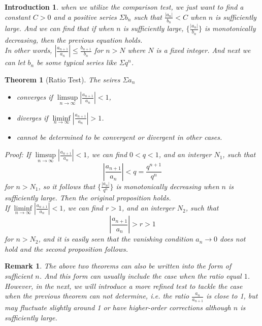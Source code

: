 \documentclass[12pt]{article}
\theoremstyle{oneline}
\newtheorem{theorem}{Theorem}[subsection]
\newtheorem{remark}{Remark}[subsection]
\theoremstyle{twoline}
\newtheorem{introduction}{Introduction}
\begin{document}
\begin{introduction}
\hspace*{2em} when we utilize the comparison test, we just want to find a constant $C>0$ and a positive series $\Sigma b_n$ such that $\frac{|a_n|}{b_n}<C$ when $n$ is sufficiently large. And we can find that if when $n$ is sufficiently large, $\{\frac{|a_n|}{b_n}\}$ is monotonically decreasing, then the previous equation holds.\\
\hspace*{2em} In other words, $|\frac{a_{n+1}}{a_n}|\leq \frac{b_{n+1}}{b_n}$ for $n>N$ where $N$ is a fixed integer. And next we can let $b_n$ be some typical series like $\Sigma q^n$.
\end{introduction}

\begin{theorem}[Ratio Test]
The seires $\Sigma a_n$
\begin{itemize}
  \item converges if $\limsup\limits_{n\to\infty}|\frac{a_{n+1}}{a_n}|<1$,
  \item diverges if $\liminf\limits_{n\to\infty}|\frac{a_{n+1}}{a_n}|>1$.
  \item cannot be determined to be convergent or divergent in other cases.
\end{itemize}
\textit{Proof:} If $\limsup\limits_{n\to\infty}|\frac{a_{n+1}}{a_n}|<1$, we can find $0<q<1$, and an interger $N_1$, such that 
\[|\frac{a_{n+1}}{a_n}|<q=\frac{q^{n+1}}{q^n}\]
for $n>N_1$, so it follows that $\{\frac{|a_n|}{q^n}\}$ is monotonically decreasing when $n$ is sufficiently large. Then the original proposition holds.\\
If $\liminf\limits_{n\to\infty}|\frac{a_{n+1}}{a_n}|<1$, we can find $r>1$, and an interger $N_2$, such that 
\[|\frac{a_{n+1}}{a_n}|>r>1\]
for $n>N_2$, and it is easily seen that the vanishing condition $a_n\to0$ does not hold and the second proposition follows.

\end{theorem}

\begin{remark}
  The above two theorems can also be written into the form of sufficient $n$. And this form can usually include the case when the ratio equal $1$. However, in the next, we will introduce a more refined test to tackle the case when the previous theorem can not determine, i.e. the ratio $\frac{a_n}{a_{n+1}}$ is close to 1, but may fluctuate slightly around 1 or have higher-order corrections although $n$ is sufficiently large.
\end{remark}
\end{document}
